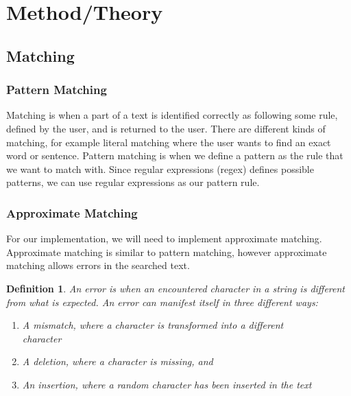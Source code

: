 \documentclass[11pt,twoside,a4paper]{article}
\newtheorem{definition}{Definition}
\begin{document}
\section{Method/Theory}
 \subsection{Matching}
  \subsubsection{Pattern Matching}
   Matching is when a part of a text is identified correctly as following some 
   rule, defined by the user, and is returned to the user. 
   There are different kinds of matching, for example literal matching where the 
   user wants to find an exact word or sentence. Pattern matching is when we define 
   a pattern as the rule that we want to match with. Since regular expressions %
   (regex) defines possible patterns, we can use regular expressions as our pattern rule.

  \subsubsection{Approximate Matching}
   For our implementation, we will need to implement 
   approximate matching. Approximate matching is similar to pattern matching, 
   however approximate matching allows errors in the searched text. 
   \begin{definition}
    An error is when an encountered character in a string is different from 
    what is expected. An error can manifest itself in three different ways:
    \begin{enumerate}
    \item A mismatch, where a character is transformed into a different \\character
    \item A deletion, where a character is missing, and
    \item An insertion, where a random character has been inserted in the text
    \end{enumerate}
   \end{definition}
   
\end{document}
